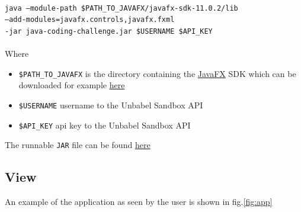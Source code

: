 \documentclass[12pt]{article}
\begin{document}
\paragraph{}
\texttt{java --module-path \$PATH\_TO\_JAVAFX/javafx-sdk-11.0.2/lib \\--add-modules=javafx.controls,javafx.fxml \\-jar java-coding-challenge.jar \$USERNAME \$API\_KEY}
\paragraph{}
Where 
\begin{itemize}
\item \texttt{\$PATH\_TO\_JAVAFX} is the directory containing the \href{https://openjfx.io/javadoc/11/}{JavaFX} SDK which can be downloaded for example  \href{https://gluonhq.com/products/javafx/}{here}
\item \texttt{\$USERNAME} username to the Unbabel Sandbox API
\item \texttt{\$API\_KEY} api key to the Unbabel Sandbox API
\end{itemize}
The runnable \texttt{JAR} file can be found \href{https://github.com/Longman006/java-coding-challenge/tree/master/out/artifacts/java_coding_challenge_jar}{here}
\subsection{View}
An example of the application as seen by the user is shown in fig.\ref{fig:app}
\end{document}
